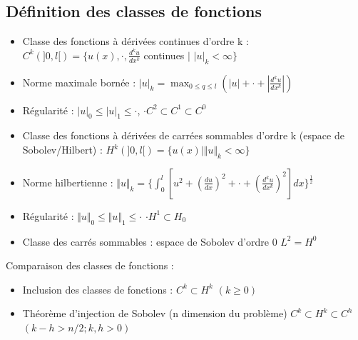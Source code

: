 \documentclass[../main.tex]{subfiles}
\begin{document}
\subsection{Définition des classes de fonctions}
\begin{itemize}
    \item Classe des fonctions à dérivées continues d'ordre k : $C^k(]0,l[) = \{u(x), \cdot, \frac{d^ku}{dx^k}$ continues $|$ $|u|_k < \infty \}$\\
    \item Norme maximale bornée : $|u|_k = \max_{0\leq q\leq l} (|u| + \cdot + |\frac{d^ku}{dx^k}|)$\\
    \item Régularité : $|u|_0 \leq |u|_1 \leq \cdot$, $\cdot C^2 \subset C^1 \subset C^0$\\
    \item Classe des fonctions à dérivées de carrées sommables d'ordre k (espace de Sobolev/Hilbert) : $H^k (]0,l[) = \{ u(x)| \Vert u \Vert_k < \infty \}$\\
    \item Norme hilbertienne : $\Vert u\Vert_k = \{ \int_0^l [u^2 + (\frac{du}{dx})^2+ \cdot + (\frac{d^k u}{dx^k})^2]dx \}^{\frac{1}{2}}$\\
    \item Régularité : $\Vert u \Vert_0 \leq \Vert u \Vert_1 \leq \cdot$ $\cdot H^1 \subset H_0$\\
    \item Classe des carrés sommables : espace de Sobolev d'ordre 0 $L^2 = H^0$\\
\end{itemize}

Comparaison des classes de fonctions : \begin{itemize}
    \item Inclusion des classes de fonctions : $C^k \subset H^k$ $(k\geq 0)$\\
    \item Théorème d'injection de Sobolev (n dimension du problème) $C^k \subset H^k \subset C^h$ $(k-h > n/2; k,h>0)$\\
\end{itemize}
\end{document}

